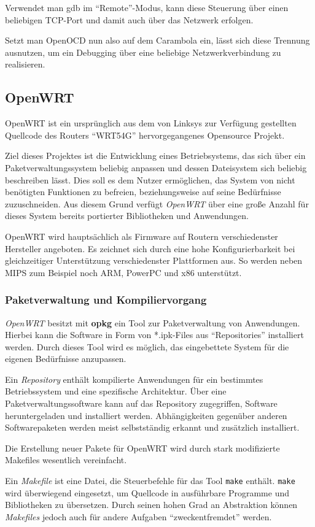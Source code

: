 Verwendet man \gls{gdb} im "`Remote"'-Modus, kann diese Steuerung über einen
beliebigen TCP-Port und damit auch über das Netzwerk erfolgen.

Setzt man OpenOCD nun also auf dem Carambola ein, lässt sich diese Trennung
ausnutzen, um ein Debugging über eine beliebige Netzwerkverbindung zu
realisieren.
\subsection{OpenWRT}\label{subs:owrt}
OpenWRT ist ein ursprünglich aus dem von Linksys zur Verfügung
gestellten Quellcode des Routers "`WRT54G"' \cite{OWRT} hervorgegangenes
Opensource Projekt.

Ziel dieses Projektes ist die Entwicklung eines Betriebsystems, das sich
über ein Paketverwaltungssystem beliebig anpassen und dessen Dateisystem sich
beliebig beschreiben lässt. Dies soll es dem Nutzer ermöglichen, das System von
nicht benötigten Funktionen zu befreien, beziehungsweise auf seine Bedürfnisse
zuzuschneiden. Aus diesem Grund verfügt \emph{OpenWRT} über eine große Anzahl
für dieses System bereits portierter Bibliotheken und Anwendungen.

OpenWRT wird hauptsächlich als Firmware auf Routern verschiedenster Hersteller
angeboten. Es zeichnet sich durch eine hohe Konfigurierbarkeit bei
gleichzeitiger Unterstützung verschiedenster Plattformen aus. So werden neben
MIPS zum Beispiel noch ARM, PowerPC und x86 unterstützt. 

 \subsubsection*{Paketverwaltung
und Kompiliervorgang} \emph{OpenWRT} besitzt mit \textbf{opkg} ein Tool zur Paketverwaltung von
Anwendungen.
Hierbei kann die Software in Form von *.ipk-Files aus "`Repositories"'
installiert werden. Durch dieses Tool wird es möglich, das eingebettete System
für die eigenen Bedürfnisse anzupassen.
\begin{definition}[Repository]
Ein \emph{Repository} enthält kompilierte Anwendungen für ein bestimmtes
Betriebssystem und eine spezifische Architektur. Über eine
Paketverwaltungssoftware kann auf das Repository zugegriffen, Software
heruntergeladen und installiert werden. Abhängigkeiten gegenüber anderen
Softwarepaketen werden meist selbstständig erkannt und zusätzlich installiert.
\end{definition}
Die Erstellung neuer Pakete für OpenWRT wird durch stark modifizierte Makefiles
wesentlich vereinfacht.
 \begin{definition}[Makefile]
Ein \emph{Makefile} ist eine Datei, die Steuerbefehle für das Tool
\texttt{make} enthält. \texttt{make} wird überwiegend eingesetzt, um Quellcode
in ausführbare Programme und Bibliotheken zu übersetzen. Durch seinen hohen
Grad an Abstraktion können \emph{Makefiles} jedoch auch für andere Aufgaben
"`zweckentfremdet"' werden.
\end{definition}

